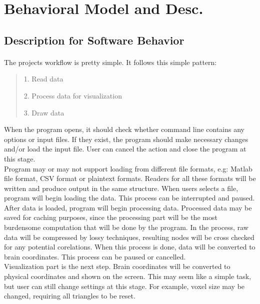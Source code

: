 \documentclass[paper=a4, fontsize=12pt]{scrartcl}	%
\numberwithin{equation}{section}		%
\numberwithin{figure}{section}			%
\numberwithin{table}{section}				%
\newcommand{\skipsubsection}[0]{\vspace{1cm}}
\begin{document}
    

	\newpage
	\section{Behavioral Model and Desc.}
            
    \skipsubsection 
        
	\subsection{Description for Software Behavior}
    \paragraph{}
    The projects workflow is pretty simple. It follows this simple pattern:
    \begin{quote}
    	1. Read data
        
        2. Process data for visualization
        
        3. Draw data
    \end{quote}
    
    When the program opens, it should check whether command line contains any options or input files. If they exist, the program should make necessary changes and/or load the input file. User can cancel the action and close the program at this stage.\\
    
    Program may or may not support loading from different file formats, e.g: Matlab file format, CSV format or plaintext formats. Readers for all these formats will be written and produce output in the same structure. When users selects a file, program will begin loading the data. This process can be interrupted and paused.\\
    
    After data is loaded, program will begin processing data. Processed data may be saved for caching purposes, since the processing part will be the most burdensome computation that will be done by the program. In the process, raw data will be compressed by lossy techniques, resulting nodes will be cross checked for any potential corelations. When this process is done, data will be converted to brain coordinates. This process can be paused or cancelled.\\
    
    Visualization part is the next step. Brain coordinates will be converted to physical coordinates and shown on the screen. This may seem like a simple task, but user can still change settings at this stage. For example, voxel size may be changed, requiring all triangles to be reset.\\
    
\end{document}
